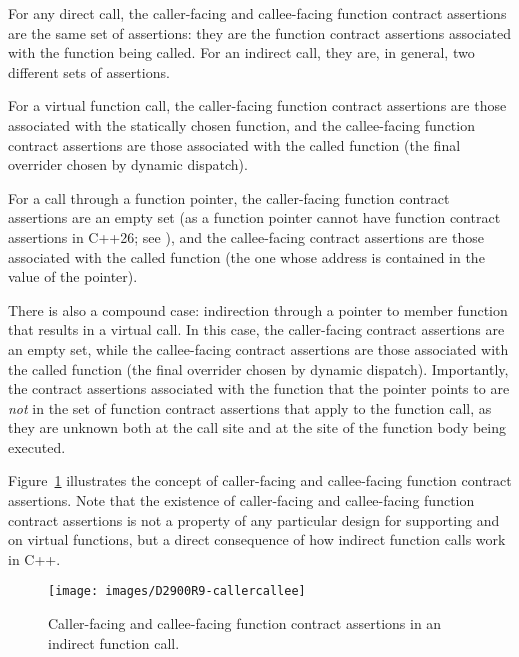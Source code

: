 For any direct call, the caller-facing and callee-facing function contract assertions are the same set of assertions: they are the function contract assertions associated with the function being called. For an indirect call, they are, in general, two different sets of assertions. 

For a virtual function call, the caller-facing function contract assertions are those associated with the statically chosen function, and the callee-facing function contract assertions are those associated with the called function (the final overrider chosen by dynamic dispatch).

For a call through a function pointer, the caller-facing function contract assertions are an empty set (as a function pointer cannot have function contract assertions in C++26; see \cite{P3327R0}), and the callee-facing contract assertions are those associated with the called function (the one whose address is contained in the value of the pointer).

There is also a compound case: indirection through a pointer to member function that results in a virtual call. In this case, the caller-facing contract assertions are an empty set, while the callee-facing contract assertions are those associated with the called function (the final overrider chosen by dynamic dispatch). Importantly, the contract assertions associated with the function that the pointer points to are \emph{not} in the set of function contract assertions that apply to the function call, as they are unknown both at the call site and at the site of the function body being executed.

Figure~\ref{fig_callercallee} illustrates the concept of caller-facing and callee-facing function contract assertions. Note that the existence of caller-facing and callee-facing function contract assertions is not a property of any particular design for supporting  and  on virtual functions, but a direct consequence of how indirect function calls work in C++.

\begin{figure}[b]
\begin{center}
\texttt{[image: images/D2900R9-callercallee]}
\end{center}
\caption{Caller-facing and callee-facing function contract assertions in an indirect function call.}
\label{fig_callercallee}
\end{figure}


